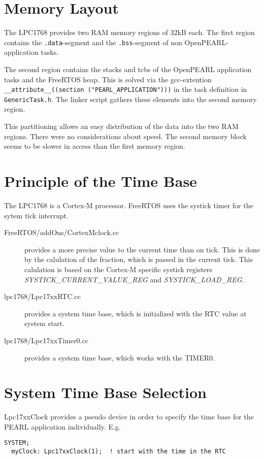 \section{Memory Layout}
The LPC1768 provides two RAM memory regions of 32kB each.
The first region contains the \texttt{.data}-segment and the 
\texttt{.bss}-segment of non OpenPEARL-application tasks.

The second region contains the stacks and tcbs of the OpenPEARL application 
tasks and the FreeRTOS heap. This is solved via the gcc-extention
\texttt{\_\_attribute\_\_((section ("PEARL\_APPLICATION")))}
in the task definition in \texttt{GenericTask.h}.
The linker script gathers these elements into the second memory region.

This partitioning allows an easy distribution of the data into the two
RAM regions. There were no considerations about speed. The second memory
block seems to be slower in access than the first memory region.
 
\section{Principle of the Time Base}
The LPC1768 is a Cortex-M processor. FreeRTOS uses the systick timer 
for the sytem tick interrupt. 
\begin{description}
\item[FreeRTOS/addOns/CortexMclock.cc] provides a more precise value to
 the current time than on tick.
This is done
by the calulation of the fraction, which is passed in the current tick.
This calulation is based on the Cortex-M specific systick registers
{\em SYSTICK\_CURRENT\_VALUE\_REG} and {\em SYSTICK\_LOAD\_REG}.
\item[lpc1768/Lpc17xxRTC.cc] provides a system time base, which is 
initialized with the RTC value at system start.
\item[lpc1768/Lpc17xxTimer0.cc] provides a system time base, which works 
with the TIMER0.
\end{description}

\section{System Time Base Selection}
Lpc17xxClock provides a pseudo device in order
   to specify the time base for the PEARL application individually. E.g.

\begin{verbatim}
SYSTEM;
  myClock: Lpc17xxClock(1);  ! start with the time in the RTC
\end{verbatim}

